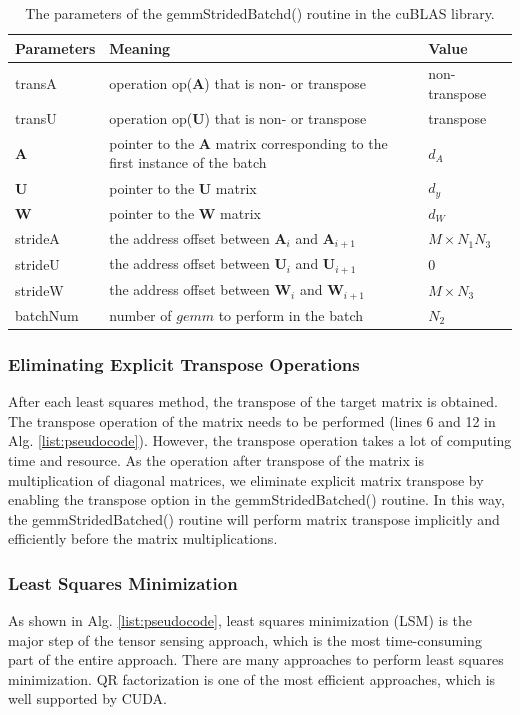 \documentclass[futureinternet,article,submit,moreauthors,pdftex,10pt,a4paper]{Definitions/mdpi}
\theoremstyle{plain}
\theoremstyle{definition}
\theoremstyle{remark}
\begin{document}
\begin{table}
\caption{The parameters of the gemmStridedBatchd() routine in the cuBLAS library.}
\label{tab:gemm}
\begin{tabular}{|l|l|l|}
\hline
Parameters & Meaning & Value \\
\hline
transA & operation op($\mathbf{A}$) that is non- or transpose & non-transpose \\
\hline
transU & operation op($\mathbf{U}$) that is non- or transpose & transpose \\
\hline
$\mathbf{A}$ & pointer to the $\mathbf{A}$ matrix corresponding to the first instance of the batch & $d_A$ \\
\hline
$\mathbf{U}$ & pointer to the $\mathbf{U}$ matrix & $d_y$ \\
\hline
$\mathbf{W}$ & pointer to the $\mathbf{W}$ matrix & $d_W$ \\
\hline
strideA & the address offset between $\mathbf{A}_i$ and $\mathbf{A}_{i+1}$ & $M\times N_1N_3$ \\
\hline
strideU & the address offset between $\mathbf{U}_i$ and $\mathbf{U}_{i+1}$ & 0 \\
\hline
strideW & the address offset between $\mathbf{W}_i$ and $\mathbf{W}_{i+1}$ & $M\times N_3$ \\
\hline
batchNum & number of $gemm$ to perform in the batch & $N_2$ \\
\hline
\end{tabular}
\end{table}

\subsubsection{Eliminating Explicit Transpose Operations}
After each least squares method, the transpose of the target matrix is obtained. The transpose operation of the matrix needs to be performed (lines 6 and 12 in Alg. \ref{list:pseudocode}). However, the transpose operation takes a lot of computing time and resource. As the operation after transpose of the matrix is multiplication of diagonal matrices, we eliminate explicit matrix transpose by enabling the transpose option in the gemmStridedBatched() routine. In this way, the gemmStridedBatched() routine will perform matrix transpose implicitly and efficiently before the matrix multiplications. 

\subsubsection{Least Squares Minimization}
As shown in Alg. \ref{list:pseudocode}, least squares minimization (LSM) is the major step of the tensor sensing approach, which is the most time-consuming part of the entire approach. There are many approaches to perform least squares minimization. QR factorization is one of the most efficient approaches, which is well supported by CUDA.
\end{document}
